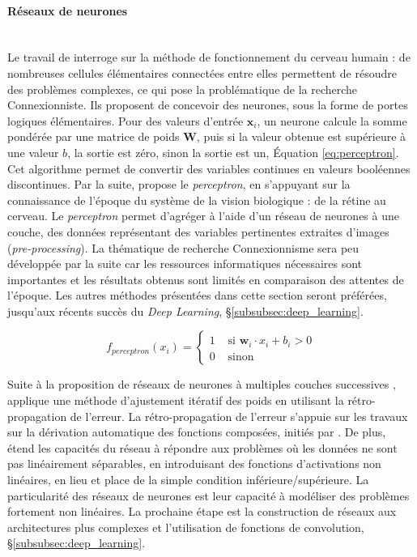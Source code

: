 \paragraph{Réseaux de neurones}\mbox{} \label{parag:neural_networks} \\
Le travail de \cite{mcculloch_logical_1943} interroge sur la méthode de fonctionnement du cerveau humain : de nombreuses cellules élémentaires connectées entre elles permettent de résoudre des problèmes complexes, ce qui pose la problématique de la recherche Connexionniste.
Ils proposent de concevoir des neurones, sous la forme de portes logiques élémentaires.
Pour des valeurs d'entrée $\mathbf{x}_i$, un neurone calcule la somme pondérée par une matrice de poids $\mathbf{W}$, puis si la valeur obtenue est supérieure à une valeur $b$, la sortie est zéro, sinon la sortie est un, Équation \ref{eq:perceptron}.
Cet algorithme permet de convertir des variables continues en valeurs booléennes discontinues.
Par la suite, \cite{rosenblatt_perceptron_1958} propose le \textit{perceptron}, en s'appuyant sur la connaissance de l'époque du système de la vision biologique : de la rétine au cerveau.
Le \textit{perceptron} permet d'agréger à l'aide d'un réseau de neurones à une couche, des données représentant des variables pertinentes extraites d'images (\textit{pre-processing}).
La thématique de recherche Connexionnisme sera peu développée par la suite car les ressources informatiques nécessaires sont importantes et les résultats obtenus sont limités en comparaison des attentes de l'époque.
Les autres méthodes présentées dans cette section seront préférées, jusqu'aux récents succès du \textit{Deep Learning}, §\ref{subsubsec:deep_learning}.

\begin{equation} \label{eq:perceptron}
f_{perceptron}(x_i)=\left\{\begin{array}{ll}{1} & {\text { si } \mathbf{w}_i \cdot x_i + b_i > 0} \\ {0} & {\text { sinon }}\end{array}\right.
\end{equation}

Suite à la proposition de réseaux de neurones à multiples couches successives \cite{fukushima_neocognitron_1980}, \cite{rumelhart_learning_1985} applique une méthode d'ajustement itératif des poids en utilisant la rétro-propagation de l'erreur.
La rétro-propagation de l'erreur s'appuie sur les travaux sur la dérivation automatique des fonctions composées, initiés par \cite{linnainmaa_taylor_1976}.
De plus, \cite{rumelhart_learning_1985} étend les capacités du réseau à répondre aux problèmes où les données ne sont pas linéairement séparables, en introduisant des fonctions d'activations non linéaires, en lieu et place de la simple condition inférieure/supérieure.
La particularité des réseaux de neurones est leur capacité à modéliser des problèmes fortement non linéaires.
La prochaine étape est la construction de réseaux aux architectures plus complexes et l'utilisation de fonctions de convolution, §\ref{subsubsec:deep_learning}.

